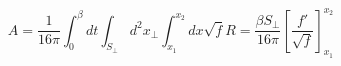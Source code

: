 \begin{equation}
A = \frac{1}{16\pi} \int_0^\beta dt \int_{S_\perp} d^2 x_\perp \int_{x_1}^{x_2} dx  
  \sqrt{f}  R 
  =\frac{\beta S_\perp}{16\pi}\left[ \frac{f'}{\sqrt{f}} \right]_{x_1}^{x_2}
\label{actionval}
\end{equation}

